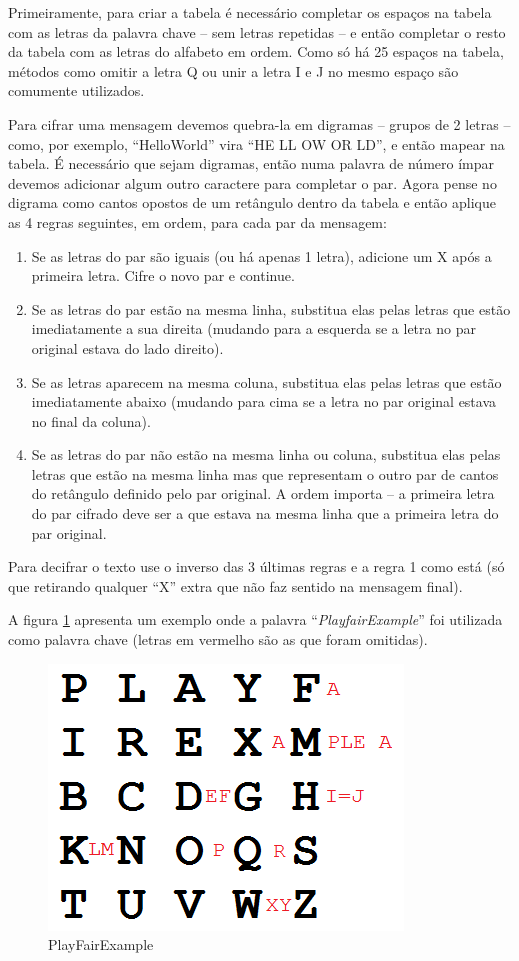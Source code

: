 \documentclass[
article,			%
11pt,				%
oneside,			%
a4paper,			%
english,			%
brazil,				%
sumario=tradicional
]{abntex2}
\begin{document}
		Primeiramente, para criar a tabela é necessário completar os espaços na tabela com as letras da palavra chave – sem letras repetidas – e então completar o resto da tabela com as letras do alfabeto em ordem. Como só há 25 espaços na tabela, métodos como omitir a letra Q ou unir a letra I e J no mesmo espaço são comumente utilizados.
		
		Para cifrar uma mensagem devemos quebra-la em digramas – grupos de 2 letras – como, por exemplo, ``HelloWorld'' vira ``HE LL OW OR LD'', e então mapear na tabela. É necessário que sejam digramas, então numa palavra de número ímpar devemos adicionar algum outro caractere para completar o par. Agora pense no digrama como cantos opostos de um retângulo dentro da tabela e então aplique as 4 regras seguintes, em ordem, para cada par da mensagem:
		
		\begin{enumerate}
			\item Se as letras do par são iguais (ou há apenas 1 letra), adicione um X após a primeira letra. Cifre o novo par e continue.
			\item Se as letras do par estão na mesma linha, substitua elas pelas letras que estão imediatamente a sua direita (mudando para a esquerda se a letra no par original estava do lado direito).
			\item Se as letras aparecem na mesma coluna, substitua elas pelas letras que estão imediatamente abaixo (mudando para cima se a letra no par original estava no final da coluna).
			\item Se as letras do par não estão na mesma linha ou coluna, substitua elas pelas letras que estão na mesma linha mas que representam o outro par de cantos do retângulo definido pelo par original. A ordem importa – a primeira letra do par cifrado deve ser a que estava na mesma linha que a primeira letra do par original.
		\end{enumerate}
	
		Para decifrar o texto use o inverso das 3 últimas regras e a regra 1 como está (só que retirando qualquer ``X'' extra que não faz sentido na mensagem final).
		
		
		A figura \ref{fig:playfair} apresenta um exemplo onde a palavra ``\textit{PlayfairExample}'' foi utilizada como palavra chave (letras em vermelho são as que foram omitidas).		
		
		\begin{figure} [!h]
		\centering
		\includegraphics[width=0.5\linewidth]{Imagens/playfair}
		\caption{PlayFairExample}
		\label{fig:playfair}
		\end{figure}
		
\end{document}
